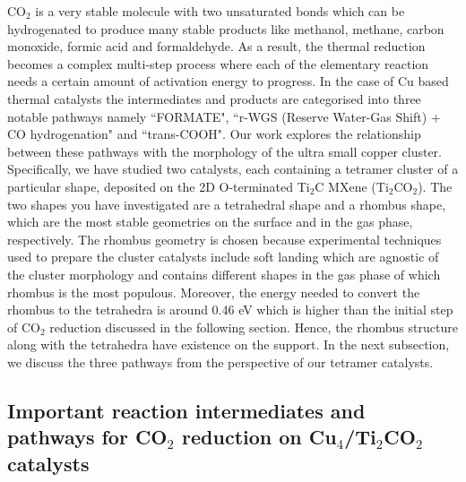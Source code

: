 CO$_2$ is a very stable molecule with two unsaturated bonds which can be hydrogenated to produce many stable products like methanol, methane, carbon monoxide, formic acid and formaldehyde. As a result, the thermal reduction becomes a complex multi-step process where each of the elementary reaction needs a certain amount of activation energy to progress. In the case of Cu based thermal catalysts the intermediates and products are categorised into three notable pathways\cite{li2015heterogeneous, grabow2011mechanism, zhao2011insight, liu2015carbon, posada2016conversion} namely ``FORMATE", ``r-WGS (Reserve Water-Gas Shift) + CO hydrogenation" and ``trans-COOH". Our work explores the relationship between these pathways with the morphology of the ultra small copper cluster. Specifically, we have studied two catalysts, each containing a tetramer cluster of a particular shape, deposited on the 2D O-terminated Ti$_2$C MXene (Ti$_2$CO$_2$). The two shapes you have investigated are a tetrahedral shape and a rhombus shape, which are the most stable geometries on the surface and in the gas phase, respectively. The rhombus geometry is chosen because experimental techniques used to prepare the cluster catalysts include soft landing\cite{yin2014atomically,lu2014effect} which are agnostic of the cluster morphology and contains different shapes in the gas phase of which rhombus is the most populous. Moreover, the energy needed to convert the rhombus to the tetrahedra is around 0.46 eV which is higher than the initial step of CO$_2$ reduction discussed in the following section. Hence, the rhombus structure along with the tetrahedra have existence on the support. In the next subsection, we discuss the three pathways from the perspective of our tetramer catalysts.   

\subsection{Important reaction intermediates and pathways for CO\texorpdfstring{$_2$}{} reduction on Cu\texorpdfstring{$_4$}{}/Ti\texorpdfstring{$_2$}{}CO\texorpdfstring{$_2$}{} catalysts}


